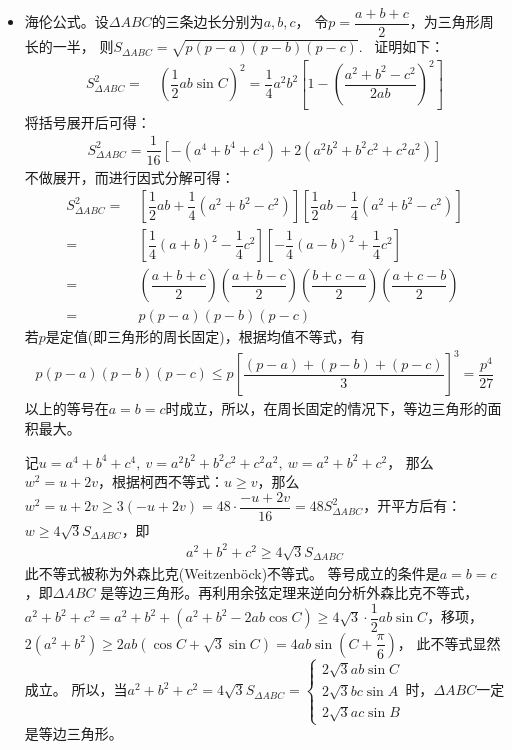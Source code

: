 \begin{itemize}[leftmargin=\inteval{\myitemleftmargin}pt,itemsep=
   \inteval{\myitemitempsep}pt,topsep=\inteval{\myitemtopsep}pt]
\item 海伦公式。设$ \Delta ABC $的三条边长分别为$ a,b,c $，
令$ p=\dfrac{a+b+c}{2} $，为三角形周长的一半，
则$ S_{\Delta ABC}=\sqrt{p(p-a)(p-b)(p-c)} $. \ 证明如下：
\begin{align*}
    S_{\Delta ABC}^2=&\ \left(\dfrac{1}{2}ab\sin C \right) ^2=
    \dfrac{1}{4}a^2b^2\left[ 1-\left( {\dfrac{a^2+b^2-c^2}{2ab}}\right)^2 \right] 
\end{align*}
将括号展开后可得：
\begin{align*}
    S_{\Delta ABC}^2=\dfrac{1}{16}\left[-(a^4+b^4+c^4)+2(a^2b^2+b^2c^2+c^2a^2)\right]
\end{align*}
不做展开，而进行因式分解可得：
\begin{align*}
    S_{\Delta ABC}^2
    =&\ \left[ \dfrac{1}{2}ab+\dfrac{1}{4}
    (a^2+b^2-c^2)\right] \left[ \dfrac{1}{2}ab-\dfrac{1}{4} (a^2+b^2-c^2) \right] \\
    =&\ \left[  \dfrac{1}{4}(a+b)^2-\dfrac{1}{4}c^2 \right] 
    \left[ -\dfrac{1}{4}(a-b)^2+\dfrac{1}{4}c^2 \right] \\
    =&\ \left(\dfrac{a+b+c}{2}\right) \left(\dfrac{a+b-c}{2}\right) 
    \left(\dfrac{b+c-a}{2}\right) \left(\dfrac{a+c-b}{2}\right) \\
    =&\ p(p-a)(p-b)(p-c)
\end{align*}
若$ p $是定值(即三角形的周长固定)，根据均值不等式，有
\begin{gather}\label{正三角形面积最大}
    p(p-a)(p-b)(p-c)\leq p\left[\dfrac{(p-a)+(p-b)+(p-c)}{3}\right]^3=\dfrac{p^4}{27}
\end{gather}
以上的等号在$ a=b=c $时成立，所以，在周长固定的情况下，等边三角形的面积最大。

记$ u=a^4+b^4+c^4,\ v=a^2b^2+b^2c^2+c^2a^2 ,\ w=a^2+b^2+c^2 $，
那么$ w^2=u+2v $，根据柯西不等式：$ u\geq v $，那么$ w^2=u+2v \geq 3(-u+2v)=
48 \cdot \dfrac{-u+2v}{16}=48 S_{\Delta ABC}^2 $，开平方后有：
$ w\geq 4\sqrt{3}S_{\Delta ABC} $，即
\begin{gather}\label{外森比克不等式}
    a^2+b^2+c^2 \geq 4\sqrt{3}S_{\Delta ABC}
\end{gather}
此不等式被称为外森比克(Weitzenböck)不等式。
等号成立的条件是$ a=b=c $，即$ \Delta ABC $
是等边三角形。再利用余弦定理来逆向分析外森比克不等式，
$ a^2+b^2+c^2=a^2+b^2+(a^2+b^2-2ab\cos C)\geq 4\sqrt{3}\cdot
\dfrac{1}{2}ab\sin C $，移项，
$ 2(a^2+b^2)\geq 2ab(\cos C+\sqrt{3}\sin C)=4ab\sin(C+\dfrac{\pi}{6}) $，
此不等式显然成立。 所以，当$ a^2+b^2+c^2=4\sqrt{3}S_{\Delta ABC}=
\begin{cases}
    2\sqrt{3}ab\sin C \\
    2\sqrt{3}bc\sin A \\
    2\sqrt{3}ac\sin B
\end{cases}$时，$ \Delta ABC $一定是等边三角形。


\end{itemize}
